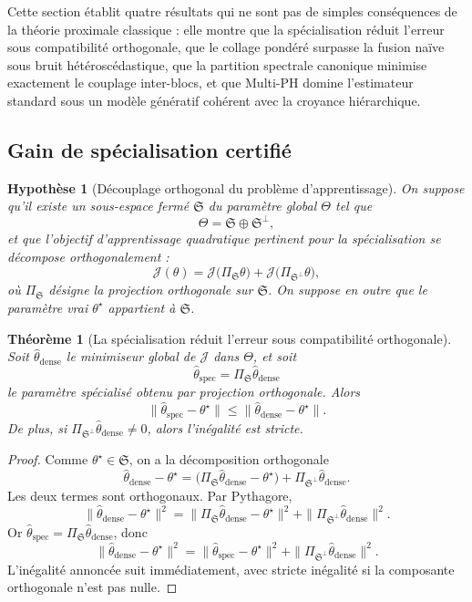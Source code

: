 \documentclass[11pt,a4paper]{article}
\newtheorem{assumption}{Hypothèse}[section]
\newtheorem{theorem}{Théorème}[section]
\newcommand{\1}{\mathbf 1}
\begin{document}
Cette section établit quatre résultats qui ne sont pas de simples conséquences de la théorie proximale classique :
elle montre que la spécialisation réduit l'erreur sous compatibilité orthogonale,
que le collage pondéré surpasse la fusion naïve sous bruit hétéroscédastique,
que la partition spectrale canonique minimise exactement le couplage inter-blocs,
et que Multi-PH domine l'estimateur standard sous un modèle génératif cohérent avec la croyance hiérarchique.

\subsection{Gain de spécialisation certifié}

\begin{assumption}[Découplage orthogonal du problème d'apprentissage]
On suppose qu'il existe un sous-espace fermé \(\mathfrak S\) du paramètre global \(\Theta\) tel que
\[
\Theta=\mathfrak S\oplus \mathfrak S^\perp,
\]
et que l'objectif d'apprentissage quadratique pertinent pour la spécialisation se décompose orthogonalement :
\[
\mathcal J(\theta)
=
\mathcal J\bigl(\Pi_{\mathfrak S}\theta\bigr)
+
\mathcal J\bigl(\Pi_{\mathfrak S^\perp}\theta\bigr),
\]
où \(\Pi_{\mathfrak S}\) désigne la projection orthogonale sur \(\mathfrak S\).
On suppose en outre que le paramètre vrai \(\theta^\star\) appartient à \(\mathfrak S\).
\end{assumption}

\begin{theorem}[La spécialisation réduit l'erreur sous compatibilité orthogonale]
Soit \(\hat\theta_{\mathrm{dense}}\) le minimiseur global de \(\mathcal J\) dans \(\Theta\), et soit
\[
\hat\theta_{\mathrm{spec}}=\Pi_{\mathfrak S}\hat\theta_{\mathrm{dense}}
\]
le paramètre spécialisé obtenu par projection orthogonale.
Alors
\[
\|\hat\theta_{\mathrm{spec}}-\theta^\star\|
\le
\|\hat\theta_{\mathrm{dense}}-\theta^\star\|.
\]
De plus, si \(\Pi_{\mathfrak S^\perp}\hat\theta_{\mathrm{dense}}\neq 0\), alors l'inégalité est stricte.
\end{theorem}

\begin{proof}
Comme \(\theta^\star\in\mathfrak S\), on a la décomposition orthogonale
\[
\hat\theta_{\mathrm{dense}}-\theta^\star
=
\bigl(\Pi_{\mathfrak S}\hat\theta_{\mathrm{dense}}-\theta^\star\bigr)
+
\Pi_{\mathfrak S^\perp}\hat\theta_{\mathrm{dense}}.
\]
Les deux termes sont orthogonaux. Par Pythagore,
\[
\|\hat\theta_{\mathrm{dense}}-\theta^\star\|^2
=
\|\Pi_{\mathfrak S}\hat\theta_{\mathrm{dense}}-\theta^\star\|^2
+
\|\Pi_{\mathfrak S^\perp}\hat\theta_{\mathrm{dense}}\|^2.
\]
Or \(\hat\theta_{\mathrm{spec}}=\Pi_{\mathfrak S}\hat\theta_{\mathrm{dense}}\), donc
\[
\|\hat\theta_{\mathrm{dense}}-\theta^\star\|^2
=
\|\hat\theta_{\mathrm{spec}}-\theta^\star\|^2
+
\|\Pi_{\mathfrak S^\perp}\hat\theta_{\mathrm{dense}}\|^2.
\]
L'inégalité annoncée suit immédiatement, avec stricte inégalité si la composante orthogonale n'est pas nulle.
\end{proof}
\end{document}
